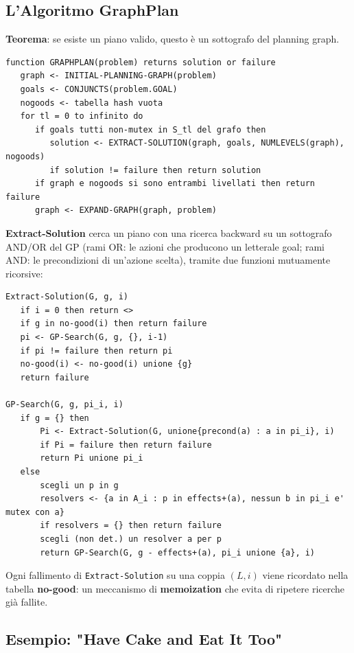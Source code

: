 \documentclass[a4paper,11pt]{article}
\begin{document}
\subsection{L'Algoritmo GraphPlan}

\textbf{Teorema}: se esiste un piano valido, questo è un sottografo del planning graph.
\begin{lstlisting}
function GRAPHPLAN(problem) returns solution or failure
   graph <- INITIAL-PLANNING-GRAPH(problem)
   goals <- CONJUNCTS(problem.GOAL)
   nogoods <- tabella hash vuota
   for tl = 0 to infinito do
      if goals tutti non-mutex in S_tl del grafo then
         solution <- EXTRACT-SOLUTION(graph, goals, NUMLEVELS(graph), nogoods)
         if solution != failure then return solution
      if graph e nogoods si sono entrambi livellati then return failure
      graph <- EXPAND-GRAPH(graph, problem)
\end{lstlisting}

\textbf{Extract-Solution} cerca un piano con una ricerca backward su un sottografo AND/OR del GP (rami OR: le azioni che producono un letterale goal; rami AND: le precondizioni di un'azione scelta), tramite due funzioni mutuamente ricorsive:
\begin{lstlisting}
Extract-Solution(G, g, i)
   if i = 0 then return <>
   if g in no-good(i) then return failure
   pi <- GP-Search(G, g, {}, i-1)
   if pi != failure then return pi
   no-good(i) <- no-good(i) unione {g}
   return failure

GP-Search(G, g, pi_i, i)
   if g = {} then
       Pi <- Extract-Solution(G, unione{precond(a) : a in pi_i}, i)
       if Pi = failure then return failure
       return Pi unione pi_i
   else
       scegli un p in g
       resolvers <- {a in A_i : p in effects+(a), nessun b in pi_i e' mutex con a}
       if resolvers = {} then return failure
       scegli (non det.) un resolver a per p
       return GP-Search(G, g - effects+(a), pi_i unione {a}, i)
\end{lstlisting}
Ogni fallimento di \texttt{Extract-Solution} su una coppia $(L,i)$ viene ricordato nella tabella \textbf{no-good}: un meccanismo di \textbf{memoization} che evita di ripetere ricerche già fallite.

\subsection{Esempio: "Have Cake and Eat It Too"}
\end{document}
